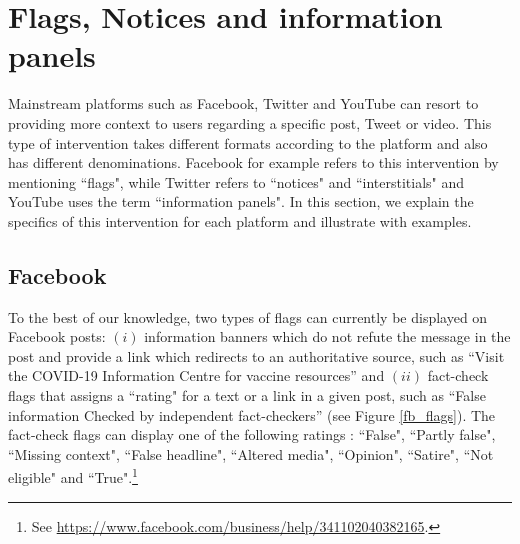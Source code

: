 \documentclass{article}
\begin{document}

\section{Flags, Notices and information panels} \label{flags}

Mainstream platforms such as Facebook, Twitter and YouTube can resort to providing more context to users regarding a specific post, Tweet or video. This type of intervention takes different formats according to the platform and also has different denominations. Facebook for example refers to this intervention by mentioning ``flags", while Twitter  refers to ``notices" and ``interstitials" and YouTube uses the term ``information panels". In this section, we explain the specifics of this intervention for each platform and illustrate with examples. 

\subsection{Facebook}

To the best of our knowledge, two types of flags can currently be displayed on Facebook posts: 
$(i)$ information banners which do not refute the message in the post and provide a link which redirects to an authoritative source, such as ``Visit the COVID-19 Information Centre for vaccine resources'' and $(ii)$ fact-check flags that assigns a ``rating" for a text or a link in a given post, such as ``False information Checked by independent fact-checkers'' (see Figure \ref{fb_flags}). The fact-check flags can display one of the following ratings : ``False", ``Partly false", ``Missing context", ``False headline", ``Altered media", ``Opinion", ``Satire", ``Not eligible" and ``True".\footnote{See \href{https://www.facebook.com/business/help/341102040382165}{https://www.facebook.com/business/help/341102040382165}.}
\end{document}
